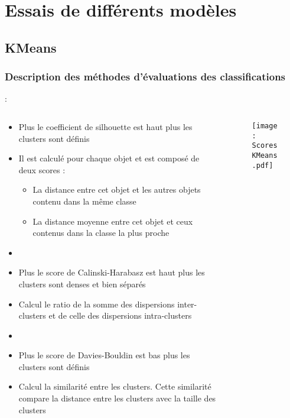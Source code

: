 \documentclass[8pt,aspectratio=169,hyperref={unicode=true}]{beamer}
\begin{document}
\section{Essais de différents modèles}
\subsection{KMeans}
\subsubsection{Description des méthodes d'évaluations des classifications}
\begin{frame}{\insertsection: \insertsubsection}{\insertsubsubsection}
    \begin{columns}
        \begin{column}{.55\textwidth}
            \begin{itemize}
                \item Plus le coefficient de silhouette est haut plus les clusters sont définis
                \item Il est calculé pour chaque objet et est composé de deux scores :
                      \begin{itemize}
                          \item La distance entre cet objet et les autres objets contenu dans la même classe
                          \item La distance moyenne entre cet objet et ceux contenus dans la classe la plus proche
                      \end{itemize}
                \item[]
                \item Plus le score de Calinski-Harabasz est haut plus les clusters sont denses et bien séparés
                \item Calcul le ratio de la somme des dispersions inter-clusters et de celle des dispersions intra-clusters
                \item[]
                \item Plus le score de Davies-Bouldin est bas plus les clusters sont définis
                \item Calcul la similarité entre les clusters. Cette similarité compare la distance entre les clusters avec la taille des clusters
            \end{itemize}
        \end{column}
        \begin{column}{.45\textwidth}
            \begin{figure}
                \texttt{[image: ScoresKMeans.pdf]}
            \end{figure}
        \end{column}
    \end{columns}
\end{frame}
\end{document}

